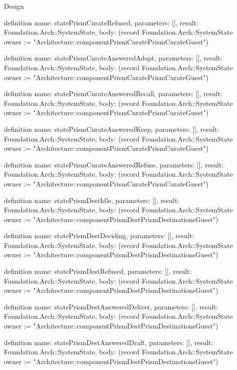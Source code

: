 \begin{lexlean}{Design}
\begin{semanticmodule}
definition{
  name: statePrismCurateRefused,
  parameters: [],
  result: Foundation.Arch::SystemState,
  body: (record Foundation.Arch::SystemState {owner := "Architecture::componentPrismCuratePrismCurateGuest"})
}

definition{
  name: statePrismCurateAnsweredAdopt,
  parameters: [],
  result: Foundation.Arch::SystemState,
  body: (record Foundation.Arch::SystemState {owner := "Architecture::componentPrismCuratePrismCurateGuest"})
}

definition{
  name: statePrismCurateAnsweredRecall,
  parameters: [],
  result: Foundation.Arch::SystemState,
  body: (record Foundation.Arch::SystemState {owner := "Architecture::componentPrismCuratePrismCurateGuest"})
}

definition{
  name: statePrismCurateAnsweredKeep,
  parameters: [],
  result: Foundation.Arch::SystemState,
  body: (record Foundation.Arch::SystemState {owner := "Architecture::componentPrismCuratePrismCurateGuest"})
}

definition{
  name: statePrismCurateAnsweredRefuse,
  parameters: [],
  result: Foundation.Arch::SystemState,
  body: (record Foundation.Arch::SystemState {owner := "Architecture::componentPrismCuratePrismCurateGuest"})
}

definition{
  name: statePrismDestIdle,
  parameters: [],
  result: Foundation.Arch::SystemState,
  body: (record Foundation.Arch::SystemState {owner := "Architecture::componentPrismDestPrismDestinationsGuest"})
}

definition{
  name: statePrismDestDeciding,
  parameters: [],
  result: Foundation.Arch::SystemState,
  body: (record Foundation.Arch::SystemState {owner := "Architecture::componentPrismDestPrismDestinationsGuest"})
}

definition{
  name: statePrismDestRefused,
  parameters: [],
  result: Foundation.Arch::SystemState,
  body: (record Foundation.Arch::SystemState {owner := "Architecture::componentPrismDestPrismDestinationsGuest"})
}

definition{
  name: statePrismDestAnsweredDeliver,
  parameters: [],
  result: Foundation.Arch::SystemState,
  body: (record Foundation.Arch::SystemState {owner := "Architecture::componentPrismDestPrismDestinationsGuest"})
}

definition{
  name: statePrismDestAnsweredDraft,
  parameters: [],
  result: Foundation.Arch::SystemState,
  body: (record Foundation.Arch::SystemState {owner := "Architecture::componentPrismDestPrismDestinationsGuest"})
}


\end{semanticmodule}
\end{lexlean}
